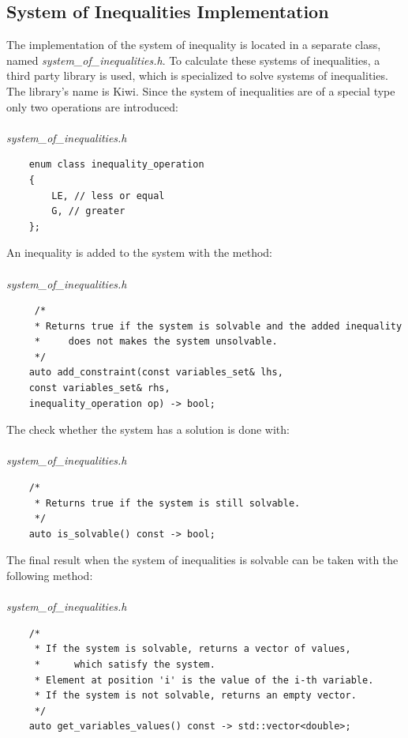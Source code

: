 \documentclass{article}
\begin{document}
	\subsection{System of Inequalities Implementation}
		The implementation of the system of inequality is located in
		a separate class, named \textit{system\_of\_inequalities.h}. 
		To calculate these systems of inequalities, a third party 
		library is used, which is specialized to solve systems of
		inequalities. The library's name is Kiwi.
		Since the system of inequalities are of a special type
		only two operations are introduced:
	\\
	\\
\noindent
\textit{system\_of\_inequalities.h}
\begin{lstlisting}
    enum class inequality_operation
    {
        LE, // less or equal
        G, // greater
    };
\end{lstlisting}
	An inequality is added to the system with the method:
	\\
	\\
\noindent
\textit{system\_of\_inequalities.h}
\begin{lstlisting}
     /*
     * Returns true if the system is solvable and the added inequality
     *     does not makes the system unsolvable.
     */
    auto add_constraint(const variables_set& lhs,
	const variables_set& rhs, 
	inequality_operation op) -> bool;
\end{lstlisting}
	The check whether the system has a solution is done with:
	\\
	\\
\noindent
\textit{system\_of\_inequalities.h}
\begin{lstlisting}
    /*
     * Returns true if the system is still solvable.
     */
    auto is_solvable() const -> bool;
\end{lstlisting}
	The final result when the system of inequalities is solvable can be 
	taken with the following method:
	\\
	\\
\noindent
\textit{system\_of\_inequalities.h}
\begin{lstlisting}
    /*
     * If the system is solvable, returns a vector of values,
     *      which satisfy the system.
     * Element at position 'i' is the value of the i-th variable.
     * If the system is not solvable, returns an empty vector.
     */
    auto get_variables_values() const -> std::vector<double>;
\end{lstlisting}
\end{document}
